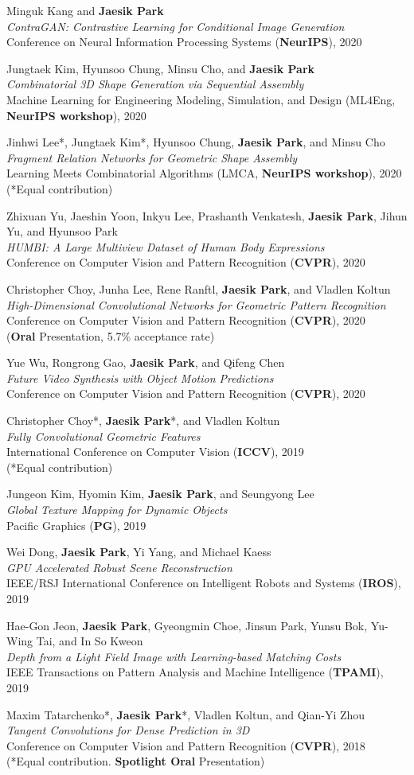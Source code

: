 \documentclass[letterpaper,11pt]{article}
\newcommand{\publicationItem}[4]{
  \small{
  \item{#1\\ \emph{#2}\\ #3\\ #4}
  }
}
\begin{document}
    \publicationItem{Minguk Kang and \textbf{Jaesik Park}}{ContraGAN: Contrastive Learning for Conditional Image Generation}{Conference on Neural Information Processing Systems (\textbf{NeurIPS}), 2020}{}
    \publicationItem{Jungtaek Kim, Hyunsoo Chung, Minsu Cho, and \textbf{Jaesik Park}}{Combinatorial 3D Shape Generation via Sequential Assembly}{Machine Learning for Engineering Modeling, Simulation, and Design (ML4Eng, \textbf{NeurIPS workshop}), 2020}{}
    \publicationItem{Jinhwi Lee*, Jungtaek Kim*, Hyunsoo Chung, \textbf{Jaesik Park}, and Minsu Cho}{Fragment Relation Networks for Geometric Shape Assembly}{Learning Meets Combinatorial Algorithms (LMCA, \textbf{NeurIPS workshop}), 2020}{(*Equal contribution)}
    \publicationItem{Zhixuan Yu, Jaeshin Yoon, Inkyu Lee, Prashanth Venkatesh, \textbf{Jaesik Park}, Jihun Yu, and Hyunsoo Park}{HUMBI: A Large Multiview Dataset of Human Body Expressions}{Conference on Computer Vision and Pattern Recognition (\textbf{CVPR}), 2020}{}
    \publicationItem{Christopher Choy, Junha Lee, Rene Ranftl, \textbf{Jaesik Park}, and Vladlen Koltun}{High-Dimensional Convolutional Networks for Geometric Pattern Recognition}{Conference on Computer Vision and Pattern Recognition (\textbf{CVPR}), 2020}{(\textbf{Oral} Presentation, 5.7\% acceptance rate)}
    \publicationItem{Yue Wu, Rongrong Gao, \textbf{Jaesik Park}, and Qifeng Chen}{Future Video Synthesis with Object Motion Predictions}{Conference on Computer Vision and Pattern Recognition (\textbf{CVPR}), 2020}{}
    \publicationItem{Christopher Choy*, \textbf{Jaesik Park}*, and Vladlen Koltun}{Fully Convolutional Geometric Features}{International Conference on Computer Vision (\textbf{ICCV}), 2019}{(*Equal contribution)}
    \publicationItem{Jungeon Kim, Hyomin Kim, \textbf{Jaesik Park}, and Seungyong Lee}{Global Texture Mapping for Dynamic Objects}{Pacific Graphics (\textbf{PG}), 2019}{}
    \publicationItem{Wei Dong, \textbf{Jaesik Park}, Yi Yang, and Michael Kaess}{GPU Accelerated Robust Scene Reconstruction}{IEEE/RSJ International Conference on Intelligent Robots and Systems (\textbf{IROS}), 2019}{}
    \publicationItem{Hae-Gon Jeon, \textbf{Jaesik Park}, Gyeongmin Choe, Jinsun Park, Yunsu Bok, Yu-Wing Tai, and In So Kweon}{Depth from a Light Field Image with Learning-based Matching Costs}{IEEE Transactions on Pattern Analysis and Machine Intelligence (\textbf{TPAMI}), 2019}{}
    \publicationItem{Maxim Tatarchenko*, \textbf{Jaesik Park}*, Vladlen Koltun, and Qian-Yi Zhou}{Tangent Convolutions for Dense Prediction in 3D}{Conference on Computer Vision and Pattern Recognition (\textbf{CVPR}), 2018}{(*Equal contribution. \textbf{Spotlight Oral} Presentation)}
\end{document}
